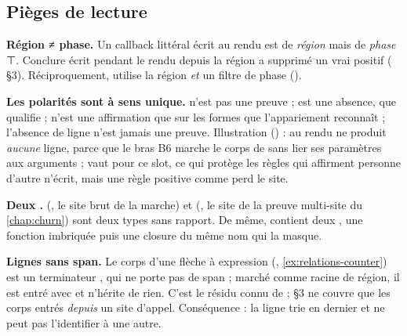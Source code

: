 \subsection{Pièges de lecture}

\begin{piege}
\textbf{Région ≠ phase.} Un callback littéral écrit au rendu est de \emph{région}  mais de \emph{phase} ⊤. Conclure \og écrit pendant le rendu\fg{} depuis la région a supprimé un vrai positif ( §3). Réciproquement,  utilise la région  \emph{et} un filtre de phase ().
\end{piege}

\begin{piege}
\textbf{Les polarités sont à sens unique.}  n'est pas une preuve ;  est une absence, que  qualifie ;  n'est une affirmation que sur les formes que l'appariement reconnaît ; l'absence de ligne n'est jamais une preuve. Illustration () :  au rendu ne produit \emph{aucune} ligne, parce que le bras B6 marche le corps de  sans lier ses paramètres aux arguments ;  vaut  pour ce slot, ce qui protège les règles qui affirment \og personne d'autre n'écrit\fg{}, mais une règle positive comme  perd le site.
\end{piege}

\begin{piege}
\textbf{Deux .}  (, le site brut de la marche) et  (, le site de la preuve multi-site du \cref{chap:churn}) sont deux types sans rapport. De même,  contient deux , une fonction imbriquée puis une closure du même nom qui la masque.
\end{piege}

\begin{piege}
\textbf{Lignes sans span.} Le corps d'une flèche à expression (, \cref{ex:relations-counter}) est un terminateur , qui ne porte pas de span ; marché comme racine de région, il est entré avec  et n'hérite de rien. C'est le résidu connu de  ;  §3 ne couvre que les corps entrés \emph{depuis} un site d'appel. Conséquence : la ligne trie en dernier et  ne peut pas l'identifier à une autre.
\end{piege}

